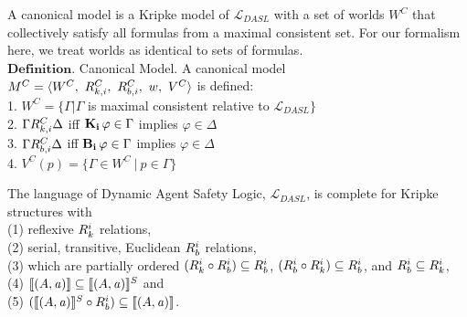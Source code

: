 A canonical model is a Kripke model of $\mathcal{L}_{DASL}$ with a set of worlds $W^C$ that collectively satisfy all formulas from a maximal consistent set. For our formalism here, we treat worlds as identical to sets of formulas.
\\
$\mathbf{Definition}$. Canonical Model. A canonical model $M^C = \langle W^C,\ R_{k,i}^C,\ R_{b,i}^C,\ w,\ V^C\rangle$ is defined:\\
1. $W^C = \{\Gamma | \Gamma$ is maximal consistent relative to $\mathcal{L}_{DASL} \}$\\
2. $\Gamma R_{k,i}^C \Delta$ iff $\mathbf{K}_{\mathbf{i}}\,\varphi \in \Gamma$ implies $\varphi \in \Delta$\\
3. $\Gamma R_{b,i}^C \Delta$ iff $\mathbf{B}_{\mathbf{i}}\,\varphi \in \Gamma$ implies $\varphi \in \Delta$\\
4. $V^C(p) = \{\Gamma \in W^C\ |\ p \in \Gamma\}$\\


\begin{tcolorbox}
	\begin{theorem}[Completeness]
		The language of Dynamic Agent Safety Logic, $\mathcal{L}_{DASL}$, is complete for Kripke structures with\\ (1) reflexive $R_{k}^i$ relations,\\ (2) serial, transitive, Euclidean $R_{b}^i$ relations, \\(3) which are partially ordered $(R_{k}^i \circ R_{b}^i) \subseteq R_{b}^i$, $(R_{b}^i \circ R_{k}^i) \subseteq R_{b}^i$, and $R_{b}^i \subseteq R_{k}^i$, \\(4) $\llbracket (A,\mathit{a})\rrbracket \subseteq \llbracket (A,\mathit{a})\rrbracket^S$%
		and\\ (5) $(\llbracket (A,\mathit{a})\rrbracket^S \circ R_{b}^i) \subseteq \llbracket (A,\mathit{a})\rrbracket$.
	\end{theorem}
\end{tcolorbox}

